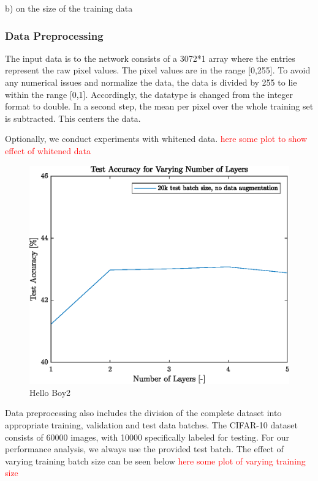 b) on the size of the training data 
 
\subsubsection{Data Preprocessing}\label{subsub:dataPreProp}

  	The input data is to the network consists of a 3072*1 array where the entries represent the raw pixel values. The pixel values are in the range [0,255]. To avoid any numerical issues and normalize the data, the data is divided by 255 to lie within the range [0,1]. Accordingly, the datatype is changed from the integer format to double. In a second step, the mean per pixel over the whole training set is subtracted. This centers the data.
  	
  	Optionally, we conduct experiments with whitened data. \textcolor{red}{here some plot to show effect of whitened data}
  	  	
  	\begin{figure}[h!]
  		\centering	  		
  		\includegraphics{images/numberlayers}
  	  	\caption{Hello Boy2}
  	  	\label{fig:test2}
  	 \end{figure}
  	
  	Data preprocessing also includes the division of the complete dataset into appropriate training, validation and test data batches. The CIFAR-10 dataset consists of 60000 images, with 10000 specifically labeled for testing. For our performance analysis, we always use the provided test batch. The effect of varying training batch size can be seen below \textcolor{red}{here some plot of varying training size}
  	
